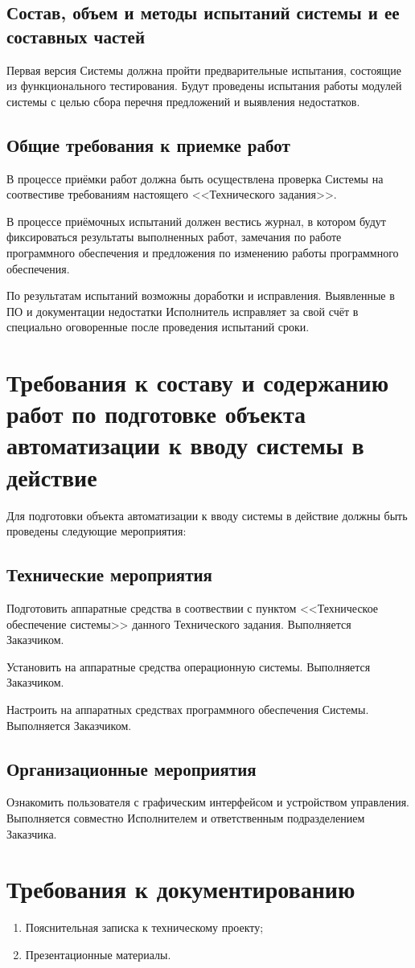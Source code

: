 \section{Состав, объем и методы испытаний системы и ее составных частей}
Первая версия Системы должна пройти предварительные испытания, состоящие из функционального 
тестирования. Будут проведены испытания работы модулей системы с целью сбора перечня 
предложений и выявления недостатков. 

\section{Общие требования к приемке работ}
В процессе приёмки работ должна быть осуществлена проверка Системы на соотвестиве требованиям 
настоящего <<Технического задания>>.

В процессе приёмочных испытаний должен вестись журнал, в котором будут фиксироваться результаты 
выполненных работ, замечания по работе программного обеспечения и предложения по изменению работы 
программного обеспечения.

По результатам испытаний возможны доработки и исправления. Выявленные в ПО и документации 
недостатки Исполнитель исправляет за свой счёт в специально оговоренные после проведения 
испытаний сроки.

\chapter{Требования к составу и содержанию работ по подготовке объекта автоматизации к вводу 
    системы в действие}
Для подготовки объекта автоматизации к вводу системы в действие должны быть проведены 
следующие мероприятия:

\section{Технические мероприятия}
Подготовить аппаратные средства в соотвествии с пунктом <<Техническое обеспечение системы>> 
данного Технического задания. Выполняется Заказчиком.

Установить на аппаратные средства операционную системы. Выполняется Заказчиком.

Настроить на аппаратных средствах программного обеспечения Системы. Выполняется Заказчиком.

\section{Организационные мероприятия}
Ознакомить пользователя с графическим интерфейсом и устройством управления. Выполняется совместно 
Исполнителем и ответственным подразделением Заказчика.

\chapter{Требования к документированию}
\begin{enumerate}
    \item Пояснительная записка к техническому проекту;
    \item Презентационные материалы.
\end{enumerate}